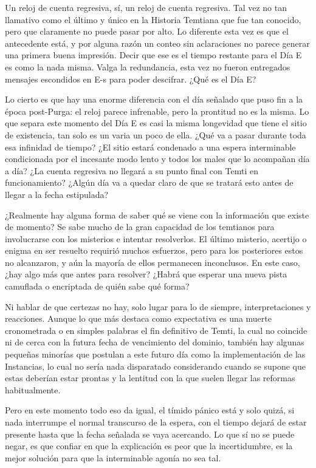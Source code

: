 \documentclass[
]{book}
\begin{document}
Un reloj de cuenta regresiva, sí, un reloj de cuenta regresiva. Tal vez no tan llamativo como el último y único en la Historia Temtiana que fue tan conocido, pero que claramente no puede pasar por alto. Lo diferente esta vez es que el antecedente está, y por alguna razón un conteo sin aclaraciones no parece generar una primera buena impresión. Decir que ese es el tiempo restante para el Día E es como la nada misma. Valga la redundancia, esta vez no fueron entregados mensajes escondidos en E-s para poder descifrar. ¿Qué es el Día E?

Lo cierto es que hay una enorme diferencia con el día señalado que puso fin a la época post-Purga: el reloj parece infrenable, pero la prontitud no es la misma. Lo que separa este momento del Día E es casi la misma longevidad que tiene el sitio de existencia, tan solo es un varia un poco de ella. ¿Qué va a pasar durante toda esa infinidad de tiempo? ¿El sitio estará condenado a una espera interminable condicionada por el incesante modo lento y todos los males que lo acompañan día a día? ¿La cuenta regresiva no llegará a su punto final con Temti en funcionamiento? ¿Algún día va a quedar claro de que se tratará esto antes de llegar a la fecha estipulada?

¿Realmente hay alguna forma de saber qué se viene con la información que existe de momento? Se sabe mucho de la gran capacidad de los temtianos para involucrarse con los misterios e intentar resolverlos. El último misterio, acertijo o enigma en ser resuelto requirió muchos esfuerzos, pero para los posteriores estos no alcanzaron, y aún la mayoría de ellos permanecen inconclusos. En este caso, ¿hay algo más que antes para resolver? ¿Habrá que esperar una nueva pista camuflada o encriptada de quién sabe qué forma?

Ni hablar de que certezas no hay, solo lugar para lo de siempre, interpretaciones y reacciones. Aunque lo que más destaca como expectativa es una muerte cronometrada o en simples palabras el fin definitivo de Temti, la cual no coincide ni de cerca con la futura fecha de vencimiento del dominio, también hay algunas pequeñas minorías que postulan a este futuro día como la implementación de las Instancias, lo cual no sería nada disparatado considerando cuando se supone que estas deberían estar prontas y la lentitud con la que suelen llegar las reformas habitualmente.

Pero en este momento todo eso da igual, el tímido pánico está y solo quizá, si nada interrumpe el normal transcurso de la espera, con el tiempo dejará de estar presente hasta que la fecha señalada se vaya acercando. Lo que sí no se puede negar, es que confiar en que la explicación es peor que la incertidumbre, es la mejor solución para que la interminable agonía no sea tal.
\end{document}
